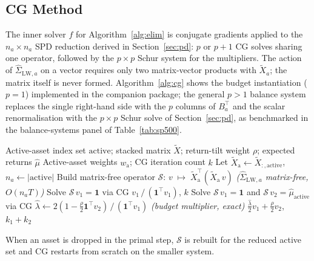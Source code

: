 \subsection{CG Method}\label{ssec:cg}

The inner solver $f$ for Algorithm~\ref{alg:elim} is conjugate gradients applied to the
$n_a \times n_a$ SPD reduction derived in Section~\ref{sec:pd}: $p$ or $p+1$ CG solves
sharing one operator, followed by the $p \times p$ Schur system for the multipliers.
The action of
$\hat\Sigma_{\mathrm{LW},a}$ on a vector requires only two matrix-vector products with
$\tilde{X}_a$; the matrix itself is never formed. Algorithm~\ref{alg:cg} shows the
budget instantiation ($p = 1$) implemented in the companion package; the general
$p > 1$ balance system replaces the single right-hand side with the $p$ columns of
$B_a^\top$ and the scalar renormalisation with the $p\times p$ Schur solve of
Section~\ref{sec:pd}, as benchmarked in the balance-systems panel of
Table~\ref{tab:sp500}.

\begin{algorithm}[ht]
\caption{CG inner step (inner solver $f$ for Algorithm~\ref{alg:elim}), budget case}\label{alg:cg}
\begin{algorithmic}[1]
\Require Active-asset index set $\mathrm{active}$;\; stacked matrix $\tilde{X}$;\;
         return-tilt weight $\rho$;\; expected returns $\hat\mu$
\Ensure Active-asset weights $w_{\mathrm{a}}$;\; CG iteration count $k$
\State Let $\tilde{X}_{\mathrm{a}} \leftarrow \tilde{X}_{:,\mathrm{active}}$,\;
       $n_a \leftarrow |\mathrm{active}|$
\State Build matrix-free operator $\mathcal{S}$:\;
    $v \;\mapsto\; \tilde{X}_{\mathrm{a}}^\top(\tilde{X}_{\mathrm{a}}\,v)$
    \hfill\textit{($\hat\Sigma_{\mathrm{LW},a}$ matrix-free, $O(n_a T)$)}
  \State Solve $\mathcal{S}\,v_1 = \mathbf{1}$ via CG
  \State \Return $v_1\,/\,(\mathbf{1}^\top v_1)$,\; $k$
\Else
  \State Solve $\mathcal{S}\,v_1 = \mathbf{1}$ and $\mathcal{S}\,v_2 = \hat\mu_{\mathrm{active}}$ via CG
  \State $\hat\lambda \leftarrow 2(1 - \tfrac{\rho}{2}\mathbf{1}^\top v_2)\,/\,(\mathbf{1}^\top v_1)$
    \hfill\textit{(budget multiplier, exact)}
  \State \Return $\tfrac{\hat\lambda}{2}v_1 + \tfrac{\rho}{2}v_2$,\; $k_1+k_2$
\EndIf
\EndFunction
\end{algorithmic}
\end{algorithm}

When an asset is dropped in the primal step, $\mathcal{S}$ is rebuilt for the reduced active
set and CG restarts from scratch on the smaller system.

